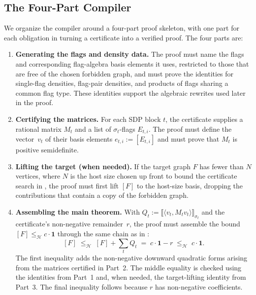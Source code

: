 \documentclass{article}
\begin{document}
\subsection{The Four-Part Compiler}
\label{sec:flagmatic-shape}
\label{sec:flagmatic-pipeline}
\label{sec:flagmatic-gen}\label{sec:flagmatic-psd}\label{sec:flagmatic-expand}%
\label{sec:flagmatic-close}\label{sec:flagmatic-script}%

We organize the compiler around a four-part proof skeleton, with one part
for each obligation in turning a certificate into a verified proof.  The four
parts are:

\begin{enumerate}
  \item \textbf{Generating the flags and density data.}  The proof must name
    the flags and corresponding flag-algebra basis elements it uses,
    restricted to those that are free of the chosen forbidden graph, and must
    prove the identities for single-flag densities, flag-pair densities, and
    products of flags sharing a common flag type.
    These identities support the algebraic rewrites used later in the proof.
  \item \textbf{Certifying the matrices.}  For each SDP block $t$, the
    certificate supplies a rational matrix $M_t$ and a list of
    $\sigma_t$-flags $E_{t,i}$.  The proof must define the vector~$v_t$ of
    their basis elements $e_{t,i}:=[E_{t,i}]$ and must prove that $M_t$ is
    positive semidefinite.
  \item \textbf{Lifting the target (when needed).}  If the target graph $F$
    has fewer than $N$ vertices, where $N$ is the host size chosen up front to
    bound the certificate search in , the proof
    must first lift $[F]$ to the
    host-size basis, dropping the contributions that contain a copy of the
    forbidden graph.
  \item \textbf{Assembling the main theorem.}  With
    $Q_t:=\bigl\llbracket\langle v_t,M_t v_t\rangle\bigr\rrbracket_{\sigma_t}$
    and the certificate's non-negative remainder~$r$, the proof must assemble
    the bound $[F] \leq_{\mathcal{H}} c\cdot\mathbf{1}$ through the same chain as
    in :
    \[
      [F]
      \;\leq_{\mathcal H}\;
      [F] + \sum_t Q_t
      \;=\;
      c\cdot\mathbf{1}-r
      \;\leq_{\mathcal H}\;
      c\cdot\mathbf{1}.
    \]
    The first inequality adds the non-negative downward quadratic forms arising
    from the matrices certified in Part~2.  The middle equality is checked using
    the identities from Part~1 and, when needed, the target-lifting identity
    from Part~3.  The final inequality follows because $r$ has non-negative
    coefficients.
\end{enumerate}
\end{document}
